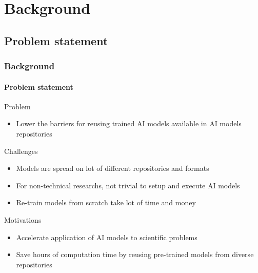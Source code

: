 \def\sectiontitle{Background}

\section{\sectiontitle}

\def\slidetitle{Problem statement}

\subsection{\slidetitle}
\begin{frame}
  \frametitle{\sectiontitle}
  \framesubtitle{\slidetitle}

  Problem
  \begin{itemize}
    \item Lower the barriers for reusing trained AI models available in AI models repositories
  \end{itemize}

  Challenges
  \begin{itemize}
    \item Models are spread on lot of different repositories and formats
    \item For non-technical researchs, not trivial to setup and execute AI models
    \item Re-train models from scratch take lot of time and money
  \end{itemize}

  Motivations
  \begin{itemize}
    \item Accelerate application of AI models to scientific problems
    \item Save hours of computation time by reusing pre-trained models from diverse repositories
  \end{itemize}
\end{frame}

\def\slidetitle{Related work}

